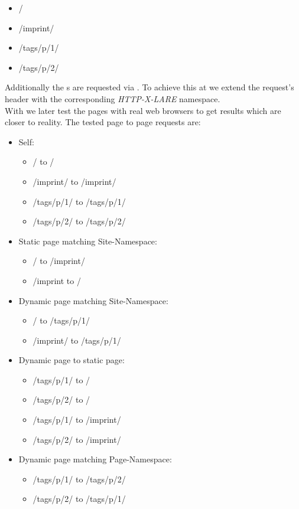 \begin{itemize}
\item /
\item /imprint/
\item /tags/p/1/
\item /tags/p/2/
\end{itemize}

\noindent{}Additionally the \webPage{}s are requested via \lare{}.
To achieve this at \curl{} we extend the request's header with the corresponding \emph{HTTP-X-LARE} namespace.
\\
With \selenium{} we later test the pages with real web browsers to get results which are closer to reality.
The tested page to page requests are:

\begin{itemize}
  \item Self:
    \begin{itemize}
      \item / to /
      \item /imprint/ to /imprint/
      \item /tags/p/1/ to /tags/p/1/
      \item /tags/p/2/ to /tags/p/2/
    \end{itemize}
  \item Static page matching Site-Namespace:
    \begin{itemize}
      \item / to /imprint/
      \item /imprint to /
    \end{itemize}
  \item Dynamic page matching Site-Namespace:
    \begin{itemize}
      \item / to /tags/p/1/
      \item /imprint/ to /tags/p/1/
    \end{itemize}
  \item Dynamic page to static page:
    \begin{itemize}
      \item /tags/p/1/ to /
      \item /tags/p/2/ to /
      \item /tags/p/1/ to /imprint/
      \item /tags/p/2/ to /imprint/
    \end{itemize}
  \item Dynamic page matching Page-Namespace:
    \begin{itemize}
      \item /tags/p/1/ to /tags/p/2/
      \item /tags/p/2/ to /tags/p/1/
    \end{itemize}
\end{itemize}

